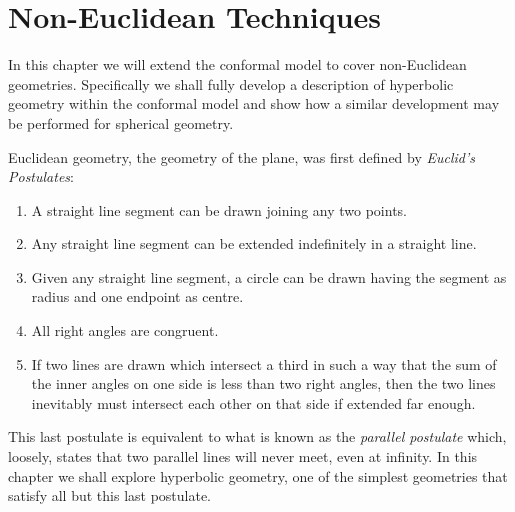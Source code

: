 \begin{savequote}
\end{savequote}

\chapter{Non-Euclidean Techniques}

In this chapter we will extend the conformal model to cover non-Euclidean
geometries. Specifically we shall fully develop a description of hyperbolic
geometry within the conformal model and show how a similar development may be
performed for spherical geometry.

Euclidean geometry, the geometry of the plane, was first defined\cite{Heath56} by
\emph{Euclid's Postulates}:

\begin{enumerate}
\item A straight line segment can be drawn joining any two points. 
\item Any straight line segment can be extended indefinitely in a straight line. 
\item Given any straight line segment, a circle can be drawn having the segment as radius and one endpoint as centre. 
\item All right angles are congruent. 
\item If two lines are drawn which intersect a third in such a way that the sum of the inner angles on one side is less than two right angles, then the two lines inevitably must intersect each other on that side if extended far enough.
\end{enumerate} 

This last postulate is equivalent to what is known as the \emph{parallel postulate}
which, loosely, states that two parallel lines will never meet, even at infinity.
In this chapter we shall explore hyperbolic geometry, one of the simplest
geometries that satisfy all but this last postulate.


